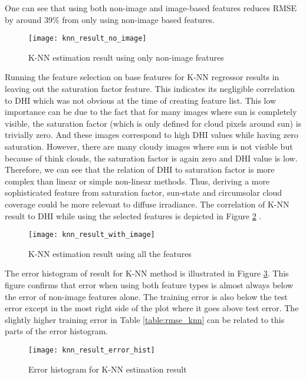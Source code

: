 One can see that using both non-image and image-based features reduces RMSE by around 39\% from only using non-image based features.

\begin{figure}[h]
\caption{K-NN estimation result using only non-image features}
\label{fig:knn_result_no_image}
\texttt{[image: knn\_result\_no\_image]}
\centering
\end{figure}

Running the feature selection on base features for K-NN regressor results in leaving out the saturation factor feature. This indicates its negligible correlation to DHI which was not obvious at the time of creating feature list. This low importance can be due to the fact that for many images where sun is completely visible, the saturation factor (which is only defined for cloud pixels around sun) is trivially zero. And these images correspond to high DHI values while having zero saturation. However, there are many cloudy images where sun is not visible but because of think clouds, the saturation factor is again zero and DHI value is low. Therefore, we can see that the relation of DHI to saturation factor is more complex than linear or simple non-linear methods. Thus, deriving a more sophisticated feature from saturation factor, sun-state and circumsolar cloud coverage could be more relevant to diffuse irradiance. The correlation of K-NN result to DHI while using the selected features is depicted in Figure \ref{fig:knn_result_all} .

\begin{figure}[h]
\caption{K-NN estimation result using all the features}
\label{fig:knn_result_all}
\texttt{[image: knn\_result\_with\_image]}
\centering
\end{figure}

The error histogram of result for K-NN method is illustrated in Figure \ref{fig:err_hist_knn}. This figure confirms that error when using both feature types is almost always below the error of non-image features alone. The training error is also below the test error except in the most right side of the plot where it goes above test error. The slightly higher training error in Table \ref{table:rmse_knn} can be related to this parts of the error histogram.

\begin{figure}[h]
\caption{Error histogram for K-NN estimation result}
\label{fig:err_hist_knn}
\texttt{[image: knn\_result\_error\_hist]}
\centering
\end{figure}

